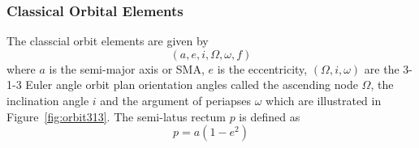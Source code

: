 \subsubsection{Classical Orbital Elements}
The classcial orbit elements are given by 
$$
	(a, e, i, \Omega, \omega, f)
$$
where $a$ is the semi-major axis or SMA, $e$ is the eccentricity, $(\Omega, i, \omega)$ are the 3-1-3 Euler angle orbit plan orientation angles called the ascending node $\Omega$, the inclination angle $i$ and the argument of periapses $\omega$ which are illustrated in Figure~\ref{fig:orbit313}.   The semi-latus rectum $p$ is defined as
\begin{equation}
	p = a (1-e^{2})
\end{equation}
\begin{figure}[t]
	\centering
	\\	

\end{figure}

